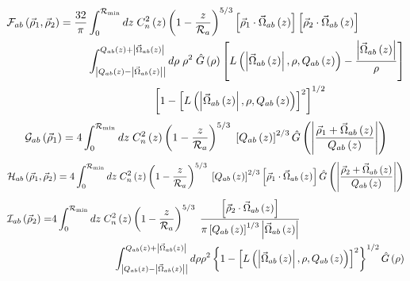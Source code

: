 \begin{equation}\label{caliph_F}
\begin{split}
\mathcal{F}_{ab}\left(\vec{\rho}_{1}, \vec{\rho}_{2}\right) = 
\frac{32}{\pi}& \int_{0}^{\mathcal{R}_{\rm min}} dz \; C_{n}^{2}\left(z\right) \left( 1 - \frac{z}{\mathcal{R}_{a}}\right)^{5/3}
\left[\vec{\rho}_{1} \cdot \vec{\Omega}_{ab}\left(z\right) \right]
\left[\vec{\rho}_{2} \cdot \vec{\Omega}_{ab}\left(z\right) \right] \\
&
\int^{Q_{ab}\left(z\right)+\left\vert \vec{\Omega}_{ab}\left(z\right)\right\vert}_{\left\vert Q_{ab}\left(z\right)-\left\vert \vec{\Omega}_{ab}\left(z\right)\right\vert\right\vert}
d\rho \; \rho^{2} \; \hat{G}\left(\rho\right) 
\left[L\left(\left\vert\vec{\Omega}_{ab}\left(z\right)\right\vert, \rho, Q_{ab}\left(z\right)\right) - \frac{\left\vert \vec{\Omega}_{ab}\left(z\right) \right\vert}{\rho}\right]\\
& 
\quad\quad\quad\quad\quad\quad
\left[1 - \left[L\left(\left\vert\vec{\Omega}_{ab}\left(z\right)\right\vert, \rho, Q_{ab}\left(z\right)\right)\right]^{2}\right]^{1/2}
\end{split}
\end{equation}
\begin{equation}\label{caliph_G}
\mathcal{G}_{ab}\left(\vec{\rho}_{1}\right) = 
4 \int_{0}^{\mathcal{R}_{\rm min}} dz \; C_{n}^{2}\left(z\right) \left( 1 - \frac{z}{\mathcal{R}_{a}}\right)^{5/3}\; 
\left[Q_{ab}\left(z\right)\right]^{2/3} 
\hat{G}\left(\left\vert \frac{\vec{\rho}_{1} + \vec{\Omega}_{ab}\left(z\right)}{Q_{ab}\left(z\right)}\right\vert\right)
\end{equation}
\begin{equation}\label{caliph_H}
\mathcal{H}_{ab}\left(\vec{\rho}_{1}, \vec{\rho}_{2}\right) = 
4 \int_{0}^{\mathcal{R}_{\rm min}} dz \; C_{n}^{2}\left(z\right) \left( 1 - \frac{z}{\mathcal{R}_{a}}\right)^{5/3}\; 
\left[Q_{ab}\left(z\right)\right]^{2/3} \left[\vec{\rho}_{1}\cdot\vec{\Omega}_{ab}\left(z\right)\right]
\hat{G}\left(\left\vert \frac{\vec{\rho}_{2} + \vec{\Omega}_{ab}\left(z\right)}{Q_{ab}\left(z\right)}\right\vert\right)
\end{equation}
\begin{equation}\label{caliph_I}
\begin{split}
\mathcal{I}_{ab}\left(\vec{\rho}_{2}\right) = & 
4 \int_{0}^{\mathcal{R}_{\rm min}} dz \; C_{n}^{2}\left(z\right) \left( 1 - \frac{z}{\mathcal{R}_{a}}\right)^{5/3}\; 
\frac{\left[\vec{\rho}_{2}\cdot\vec{\Omega}_{ab}\left(z\right)\right] }{\pi \left[Q_{ab}\left(z\right)\right]^{1/3} 
\left\vert\vec{\Omega}_{ab}\left(z\right)\right\vert} \\
& 
\quad\quad\quad\quad\quad\quad
\int^{Q_{ab}\left(z\right) +\left\vert \vec{\Omega}_{ab}\left(z\right)\right\vert}_{\left\vert Q_{ab}\left(z\right) - \left\vert\vec{\Omega}_{ab}\left(z\right)\right\vert\right\vert}
d\rho \rho^{2} \left\{1 - \left[L\left(\left\vert\vec{\Omega}_{ab}\left(z\right)\right\vert, \rho, Q_{ab}\left(z\right)\right)\right]^{2}\right\}^{1/2} 
\hat{G}\left(\rho\right)
\end{split}
\end{equation}


